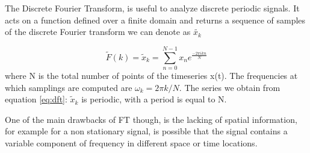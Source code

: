 \documentclass[11pt]{report}
\begin{document}
The Discrete Fourier Transform, is useful to analyze discrete periodic signals.
It acts on a function defined over a finite domain and returns a sequence of samples of the discrete Fourier transform we can denote as $\tilde{x_k}$

\begin{equation}\label{eq:dft}
 \tilde{F}(k) = \tilde{x}_k = \sum_{n = 0}^{N-1}x_n e^{\frac{-2\pi i k n}{N}}
\end{equation}
where N is the total number of points of the timeseries x(t).
The frequencies at which samplings are computed are $\omega_k = 2\pi k/N$.
The series we obtain from equation \ref{eq:dft}: $\tilde{x}_k$ is periodic, with a period is equal to N.

One of the main drawbacks of FT though, is the lacking of spatial information, for example for a non stationary signal, is possible that the signal contains a variable component of frequency in different space or time locations.
\end{document}
